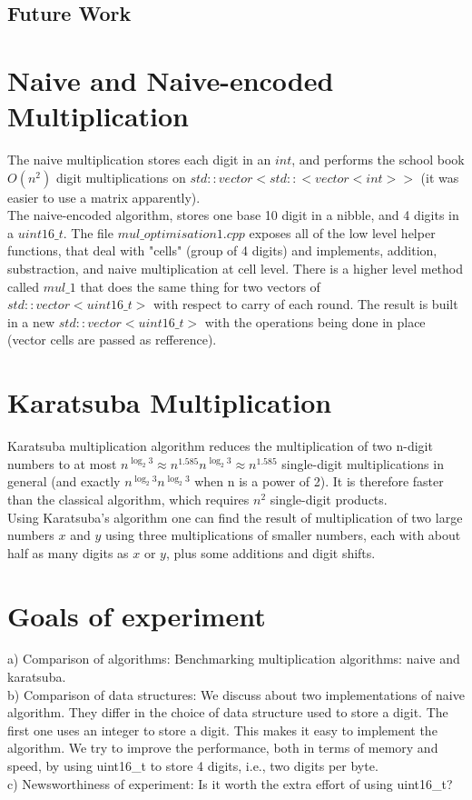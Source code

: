 \documentclass{DIKU-report}
\begin{document}
\subsection*{Future Work}
\newpage
\section{Naive and Naive-encoded Multiplication}
The naive multiplication stores each digit in an $int$, and performs the school book $O(n^2)$ digit multiplications on $std::vector<std::<vector<int>>$ (it was easier to use a matrix apparently).\\
The naive-encoded algorithm, stores one base 10 digit in a nibble, and 4 digits in a $uint16\_t$. The file $mul\_optimisation1.cpp$ exposes all of the low level helper functions, that deal with "cells" (group of 4 digits) and implements, addition, substraction, and naive multiplication at cell level. There is a higher level method called $mul\_1$ that does the  same thing for two vectors of $std::vector<uint16\_t>$ with respect to carry of each round. The result is built in a new $std::vector<uint16\_t>$ with the operations being done in place (vector cells are passed as refference).
\section{Karatsuba Multiplication}
Karatsuba multiplication algorithm reduces the multiplication of two n-digit numbers to at most ${\displaystyle n^{\log _{2}3}\approx n^{1.585}} n^{\log _{2}3}\approx n^{1.585}$ single-digit multiplications in general (and exactly ${\displaystyle n^{\log _{2}3}} n^{\log _{2}3}$ when n is a power of 2). It is therefore faster than the classical algorithm, which requires $n^2$ single-digit products.
\\Using Karatsuba's algorithm one can find the result of multiplication of two large numbers $x$ and $y$ using three multiplications of smaller numbers, each with about half as many digits as $x$ or $y$, plus some additions and digit shifts.



\section{Goals of experiment}
a) Comparison of algorithms: Benchmarking multiplication algorithms: naive and karatsuba.
\\b) Comparison of data structures: We discuss about two implementations of naive algorithm. They differ in the choice of data structure used to store a digit. The first one uses an integer to store a digit. This makes it easy to implement the algorithm. We try to improve the performance, both in terms of memory and speed, by using uint16\_t to store 4 digits, i.e., two digits per byte. 
\\c) Newsworthiness of experiment: Is it worth the extra effort of using uint16\_t?
\end{document}
